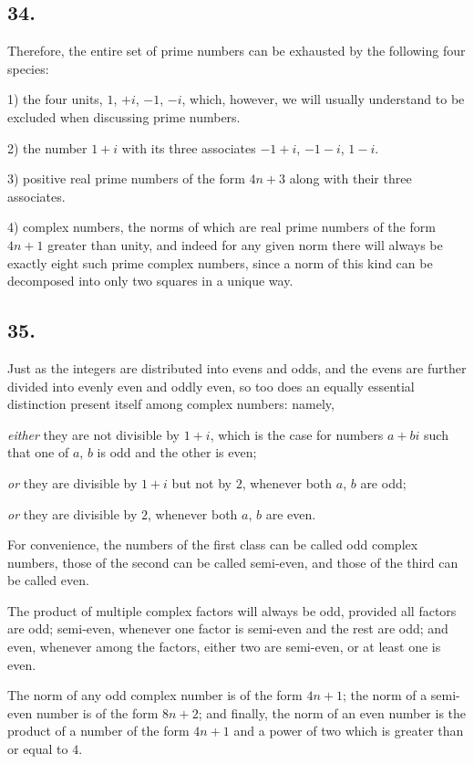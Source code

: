 \documentclass[twoside,12pt]{memoir}
\begin{document}
\subsection*{34.}

Therefore, the entire set of prime numbers can be exhausted by the following four species:

1) the four units, \(1\), \(+i\), \(-1\), \(-i\), which, however, we will usually understand to be excluded when discussing prime numbers.

2) the number \(1+i\) with its three associates \(-1+i\), \(-1-i\), \(1-i\).

3) positive real prime numbers of the form \(4n+3\) along with their three associates.

4) complex numbers, the norms of which are real prime numbers of the form \(4n+1\) greater than unity, and indeed for any given norm there will always be exactly eight such prime complex numbers, since a norm of this kind can be decomposed into only two squares in a unique way.
%

\subsection*{35.}

Just as the integers are distributed into evens and odds, and the evens are further divided into evenly even and oddly even, so too does an equally essential distinction present itself among complex numbers: namely,

\textit{either} they are not divisible by \(1+i\), which is the case for numbers \(a+bi\) such that one of \(a\), \(b\) is odd and the other is even;

\textit{or} they are divisible by \(1+i\) but not by \(2\), whenever both \(a\), \(b\) are odd;

\textit{or} they are divisible by \(2\), whenever both \(a\), \(b\) are even.

For convenience, the numbers of the first class can be called odd complex numbers, those of the second can be called semi-even, and those of the third can be called even.

The product of multiple complex factors will always be odd, provided all factors are odd; semi-even, whenever one factor is semi-even and the rest are odd; and even, whenever among the factors, either two are semi-even, or at least one is even.

The norm of any odd complex number is of the form \(4n+1\); the norm of a semi-even number is of the form \(8n+2\); and finally, the norm of an even number is the product of a number of the form \(4n+1\) and a power of two which is greater than or equal to \(4\).
%
\end{document}
